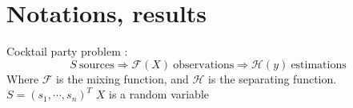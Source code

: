 \documentclass[a4paper,11pt,titlepage]{article}
\begin{document}
\section{Notations, results}
Cocktail party problem :
\begin{equation*}
	S \ \text{sources} \Rightarrow \mathcal{F}(X) \ \text{observations} \Rightarrow \mathcal{H}(y) \ \text{estimations}
\end{equation*}
Where $\mathcal{F}$ is the mixing function, and $\mathcal{H}$ is the separating function. $S = (s_1,\cdots,s_n)^T$ $X$ is a random variable 
\end{document}
